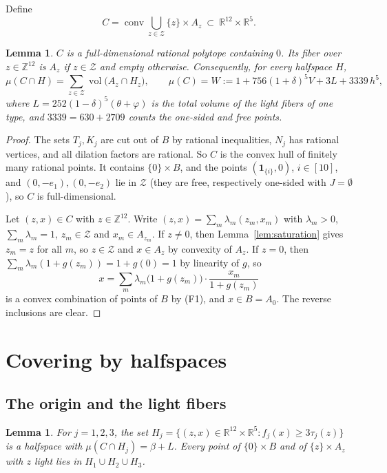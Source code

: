 \documentclass[11pt]{article}
\newtheorem{lemma}[theorem]{Lemma}
\newcommand{\R}{\mathbb{R}}
\newcommand{\Z}{\mathbb{Z}}
\newcommand{\Zcal}{\mathcal{Z}}
\newcommand{\1}{\mathbf{1}}
\DeclareMathOperator{\conv}{conv}
\DeclareMathOperator{\vol}{vol}
\begin{document}
Define
\[
C=\conv\bigcup_{z\in\Zcal}\{z\}\times A_z\ \subset\ \R^{12}\times\R^5.
\]

\begin{lemma}\label{lem:polytope}
$C$ is a full-dimensional rational polytope containing $0$. Its fiber over $z\in\Z^{12}$ is $A_z$ if $z\in\Zcal$ and empty
otherwise. Consequently, for every halfspace $H$,
\[
\mu(C\cap H)=\sum_{z\in\Zcal}\vol\bigl(A_z\cap H_z\bigr),\qquad\mu(C)=W:=1+756(1+\delta)^5V+3L+3339\,h^5,
\]
where $L=252(1-\delta)^5(\theta+\varphi)$ is the total volume of the light fibers of one type, and $3339=630+2709$ counts
the one-sided and free points.
\end{lemma}

\begin{proof}
The sets $T_j,K_j$ are cut out of $B$ by rational inequalities, $N_j$ has rational vertices, and all dilation factors are
rational. So $C$ is the convex hull of finitely many rational points. It contains $\{0\}\times B$, and the points
$(\1_{\{i\}},0)$, $i\in[10]$, and $(0,-e_1),(0,-e_2)$ lie in $\Zcal$ (they are free, respectively one-sided with
$J=\emptyset$), so $C$ is full-dimensional.

Let $(z,x)\in C$ with $z\in\Z^{12}$. Write $(z,x)=\sum_m\lambda_m(z_m,x_m)$ with $\lambda_m>0$, $\sum_m\lambda_m=1$,
$z_m\in\Zcal$ and $x_m\in A_{z_m}$. If $z\ne0$, then Lemma~\ref{lem:saturation} gives $z_m=z$ for all $m$, so $z\in\Zcal$
and $x\in A_z$ by convexity of $A_z$. If $z=0$, then $\sum_m\lambda_m(1+g(z_m))=1+g(0)=1$ by linearity of $g$, so
\[
x=\sum_m\lambda_m\bigl(1+g(z_m)\bigr)\cdot\frac{x_m}{1+g(z_m)}
\]
is a convex combination of points of $B$ by (F1), and $x\in B=A_0$. The reverse inclusions are clear.
\end{proof}

\section{Covering by halfspaces}\label{sec:covering}

\subsection{The origin and the light fibers}

\begin{lemma}\label{lem:origin}
For $j=1,2,3$, the set $H_j=\{(z,x)\in\R^{12}\times\R^5:f_j(x)\ge3\tau_j(z)\}$ is a halfspace with
$\mu(C\cap H_j)=\beta+L$. Every point of $\{0\}\times B$ and of $\{z\}\times A_z$ with $z$ light lies in
$H_1\cup H_2\cup H_3$.
\end{lemma}
\end{document}
